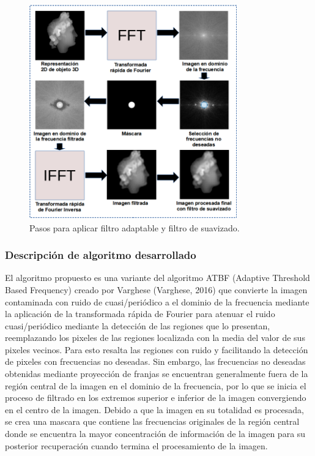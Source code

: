 \documentclass[10pt,letterpaper]{article}
\begin{document}
\begin{figure}[H]
	\centering
    \includegraphics[width=0.8\textwidth]{tifs/tif22.png}
    \caption{Pasos para aplicar filtro adaptable y filtro de suavizado.}
    \label{tif22}
\end{figure}


\subsubsection*{Descripción de algoritmo desarrollado} 
El algoritmo propuesto es una variante del algoritmo ATBF (Adaptive Threshold Based Frequency) creado por Varghese (Varghese, 2016)\cite{Varghese:} que convierte la imagen contaminada con ruido de cuasi/periódico a el dominio de la frecuencia mediante la aplicación de la transformada rápida de Fourier para atenuar el ruido cuasi/periódico mediante la detección de las regiones que lo presentan, reemplazando los pixeles de las regiones localizada con la media del valor de sus pixeles vecinos. Para esto resalta las regiones con ruido y facilitando la detección de pixeles con frecuencias no deseadas. Sin embargo, las frecuencias no deseadas obtenidas mediante proyección de franjas se encuentran generalmente fuera de la región central de la imagen en el dominio de la frecuencia, por lo que se inicia el proceso de filtrado en los extremos superior e inferior de la imagen convergiendo en el centro de la imagen. Debido a que la imagen en su totalidad es procesada, se crea una mascara que contiene las frecuencias originales de la región central donde se encuentra la mayor concentración de información de la imagen para su posterior recuperación cuando termina el procesamiento de la imagen\cite{Espi:Bern}.
\end{document}
